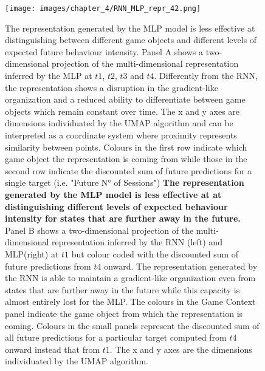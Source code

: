 \begin{figure}[ht]
\centering
\texttt{[image: images/chapter\_4/RNN\_MLP\_repr\_42.png]}
\caption[Lower dimensional representation of the latent states generated by the time-distributed MLP architecture]{The representation generated by the MLP model is less effective at distinguishing between different game objects and different levels of expected future behaviour intensity. Panel A shows a two-dimensional projection of the multi-dimensional representation inferred by the MLP at $t1$, $t2$, $t3$ and $t4$. Differently from the RNN, the representation shows a disruption in the gradient-like organization and a reduced ability to differentiate between game objects which remain constant over time. The x and y axes are dimensions individuated by the UMAP algorithm and can be interpreted as a coordinate system where proximity represents similarity between points. Colours in the first row indicate which game object the representation is coming from while those in the second row indicate the discounted sum of future predictions for a single target (i.e. "Future N° of Sessions") \textbf{The representation generated by the MLP model is less effective at at distinguishing different levels of expected behaviour intensity for states that are further away in the future.} Panel B shows a two-dimensional projection of the multi-dimensional representation inferred by the RNN (left) and MLP(right) at $t1$ but colour coded with the discounted sum of future predictions from $t4$ onward. The representation generated by the RNN is able to maintain a gradient-like organization even from states that are further away in the future while this capacity is almost entirely lost for the MLP. The colours in the Game Context panel indicate the game object from which the representation is coming. Colours in the small panels represent the discounted sum of all future predictions for a particular target computed from $t4$ onward instead that from $t1$. The x and y axes are the dimensions individuated by the UMAP algorithm.}
\label{predictive_panel}
\end{figure}
